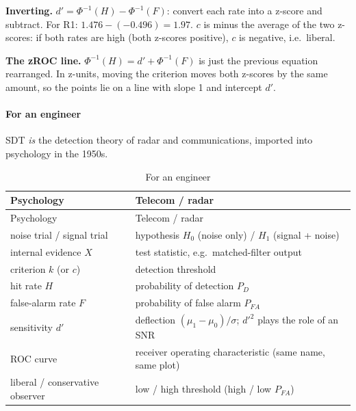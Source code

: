\textbf{Inverting.} \(d' = \Phi^{-1}(H) - \Phi^{-1}(F)\): convert each
rate into a z-score and subtract. For R1: \(1.476 - (-0.496) = 1.97\).
\(c\) is minus the average of the two z-scores: if both rates are high
(both z-scores positive), \(c\) is negative, i.e.~liberal.

\textbf{The zROC line.} \(\Phi^{-1}(H) = d' + \Phi^{-1}(F)\) is just the
previous equation rearranged. In z-units, moving the criterion moves
both z-scores by the same amount, so the points lie on a line with slope
1 and intercept \(d'\).

\paragraph{For an engineer}

SDT \emph{is} the detection theory of radar and communications, imported
into psychology in the 1950s.

\begin{longtable}[]{@{}
  >{\raggedright\arraybackslash}p{}
  >{\raggedright\arraybackslash}p{}@{}}
\caption{\centering For an engineer}\tabularnewline
\toprule\noalign{}
\begin{minipage}[b]{\linewidth}\raggedright
Psychology
\end{minipage} & \begin{minipage}[b]{\linewidth}\raggedright
Telecom / radar
\end{minipage} \\
\midrule\noalign{}
\endfirsthead
\toprule\noalign{}
\begin{minipage}[b]{\linewidth}\raggedright
Psychology
\end{minipage} & \begin{minipage}[b]{\linewidth}\raggedright
Telecom / radar
\end{minipage} \\
\midrule\noalign{}
\endhead
\bottomrule\noalign{}
\endlastfoot
noise trial / signal trial & hypothesis \(H_0\) (noise only) / \(H_1\)
(signal + noise) \\
internal evidence \(X\) & test statistic, e.g.~matched-filter output \\
criterion \(k\) (or \(c\)) & detection threshold \\
hit rate \(H\) & probability of detection \(P_D\) \\
false-alarm rate \(F\) & probability of false alarm \(P_{FA}\) \\
sensitivity \(d'\) & deflection \((\mu_1 - \mu_0)/\sigma\); \(d'^2\)
plays the role of an SNR \\
ROC curve & receiver operating characteristic (same name, same plot) \\
liberal / conservative observer & low / high threshold (high / low
\(P_{FA}\)) \\
\end{longtable}

